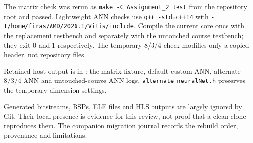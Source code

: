 \documentclass[11pt,a4paper]{article}
\begin{document}
The matrix check was rerun as \texttt{make -C Assignment\_2 test} from the
repository root and passed. Lightweight ANN checks use \texttt{g++ -std=c++14}
with \texttt{-I/home/firas/AMD/2026.1/Vitis/include}. Compile the current core
once with the replacement testbench and separately with the untouched course
testbench; they exit 0 and 1 respectively. The temporary 8/3/4 check modifies
only a copied header, not repository files.

Retained host output is in : the matrix fixture,
default custom ANN, alternate 8/3/4 ANN and untouched-course ANN logs.
\texttt{alternate\_neuralNet.h} preserves the temporary dimension settings.

Generated bitstreams, BSPs, ELF files and HLS outputs are largely ignored by
Git. Their local presence is evidence for this review, not proof that a clean
clone reproduces them. The companion migration journal records the rebuild
order, provenance and limitations.
\end{document}
